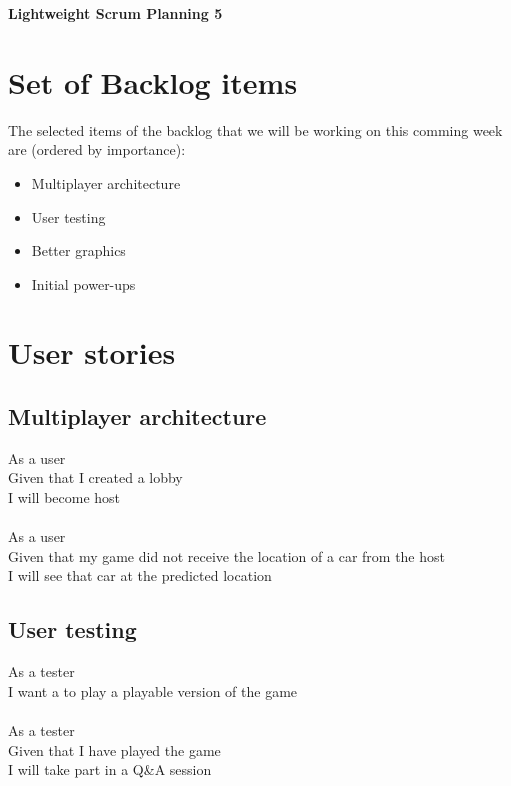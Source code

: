\documentclass{article}
\begin{document}
\begin{minipage}[H]{\textwidth}
\vspace{0.3cm}
		\begin{center}
		\vspace{0.3cm}
			\Huge{\textbf{Lightweight Scrum Planning 5}}\\
		\vspace{0.3cm}	
		\vspace{0.7cm}		
		\end{center}
	\end{minipage}

\section*{Set of Backlog items}
The selected items of the backlog that we will be working on this comming week  are (ordered by importance):
\begin{itemize}
	\item Multiplayer architecture
	\item User testing
	\item Better graphics
	\item Initial power-ups	
\end{itemize}

\section*{User stories}
\subsection*{Multiplayer architecture}
As a user\\
Given that I created a lobby\\
I will become host\\\\
As a user\\
Given that my game did not receive the location of a car from the host\\
I will see that car at the predicted location
\subsection*{User testing}
As a tester\\
I want a to play a playable version of the game\\\\
As a tester\\
Given that I have played the game\\
I will take part in a Q\&A session
\end{document}
